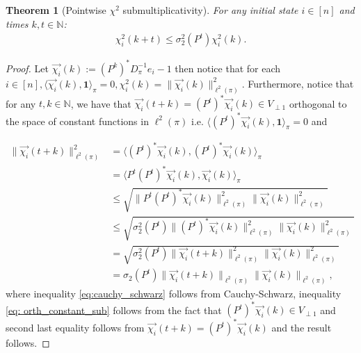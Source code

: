 \documentclass[preprint]{imsart}
\theoremstyle{plain}
\newtheorem{theorem}{Theorem}[section]
\theoremstyle{definition}
\begin{document}
\begin{theorem}[Pointwise $\chi^2$ submultiplicativity]
    For any initial state $i \in [n]$ and times $k,t \in \mathbb{N}$:
    \begin{align}
        \chi_{i}^{2}(k+t) \leq \sigma_{2}^{2}(P^{t}) \chi_{i}^{2}(k).
    \end{align}
\end{theorem}
\begin{proof}
    Let $\vec{\chi_{i}}(k):=(P^{k})^{*}D_{\pi}^{-1}e_{i}-1$ then notice that for each $i \in [n], \langle \vec{\chi_{i}}(k),\mathbf{1}\rangle_{\pi}=0, \chi_{i}^{2}(k)=\|\vec{\chi_{i}}(k)\|_{\ell^{2}(\pi)}^{2}$. Furthermore, notice that for any $t,k \in \mathbb{N}$, we have that $\vec{\chi_{i}}(t+k)=(P^{t})^{*}\vec{\chi_{i}}(k) \in V_{\perp 1}$ orthogonal to the space of constant functions in $\ell^{2}(\pi)$ i.e. $\langle (P^{t})^{*}\vec{\chi_{i}}(k),\mathbf{1}\rangle_{\pi}=0$ and

    \begin{align}
        \|\vec{\chi_{i}}(t+k)\|_{\ell^{2}(\pi)}^{2}& \nonumber =\langle (P^{t})^{*} \vec{\chi_{i}}(k) ,(P^{t})^{*} \vec{\chi_{i}}(k)\rangle_{\pi}\\ &=\langle P^{t}(P^{t})^{*} \vec{\chi_{i}}(k) , \vec{\chi_{i}}(k)\rangle_{\pi} \\ & \label{eq:cauchy_schwarz} \leq \sqrt{\|P^{t}(P^{t})^{*} \vec{\chi_{i}}(k)\|_{\ell^{2}(\pi)}^{2}\|\vec{\chi_{i}}(k)\|_{\ell^{2}(\pi)}^{2}} \\ & \label{eq: orth_constant_sub} \leq \sqrt{\sigma_{2}^{2}(P^{t})\|(P^{t})^{*} \vec{\chi_{i}}(k)\|_{\ell^{2}(\pi)}^{2}\|\vec{\chi_{i}}(k)\|_{\ell^{2}(\pi)}^{2}}   \\ & \nonumber = \sqrt{\sigma_{2}^{2}(P^{t})\|\vec{\chi_{i}}(t+k)\|_{\ell^{2}(\pi)}^{2}\|\vec{\chi_{i}}(k)\|_{\ell^{2}(\pi)}^{2}} \\ & \nonumber =\sigma_{2}(P^{t})\|\vec{\chi_{i}}(t+k)\|_{\ell^{2}(\pi)}\|\vec{\chi_{i}}(k)\|_{\ell^{2}(\pi)},
    \end{align}
    where inequality \ref{eq:cauchy_schwarz} follows from Cauchy-Schwarz, inequality \ref{eq: orth_constant_sub} follows from the fact that $(P^{t})^{*}\vec{\chi_{i}}(k) \in V_{\perp 1}$ and second last equality follows from $\vec{\chi_{i}}(t+k)=(P^{t})^{*}\vec{\chi_{i}}(k)$ and the result follows.  
\end{proof}
\end{document}
